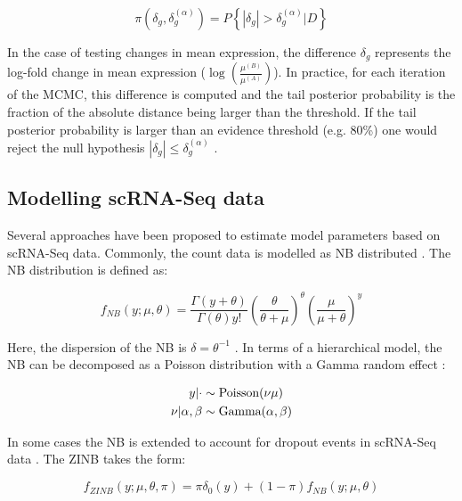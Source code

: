 \begin{equation}
\pi(\delta_g,\delta_g^{(\alpha)})=P\left\lbrace|\delta_g|>\delta_g^{(\alpha)}|D\right\rbrace
\end{equation}

In the case of testing changes in mean expression, the difference $\delta_g$ represents the log-fold change in mean expression ($\log(\frac{\mu^{(B)}}{\mu^{(A)}})$). 
In practice, for each iteration of the MCMC, this difference is computed and the tail posterior probability is the fraction of the absolute distance being larger than the threshold. 
If the tail posterior probability is larger than an evidence threshold (e.g. 80\%) one would reject the null hypothesis $|\delta_g|\leq\delta_g^{(\alpha)}$ \citep{Vallejos2016}. 

\subsection{Modelling scRNA-Seq data}

Several approaches have been proposed to estimate model parameters based on scRNA-Seq data. 
Commonly, the count data is modelled as \gls{NB} distributed \citep{Vallejos2015BASiCS, Risso2018, Lopez2018}. 
The NB distribution is defined as:

\begin{equation}
f_{NB}(y;\mu,\theta)=\frac{\Gamma(y+\theta)}{\Gamma(\theta)y!}\left(\frac{\theta}{\theta + \mu}\right)^\theta\left(\frac{\mu}{\mu + \theta}\right)^y
\end{equation}

Here, the dispersion of the NB is $\delta=\theta^{-1}$ \cite{Risso2018}. 
In terms of a hierarchical model, the NB can be decomposed as a Poisson distribution with a Gamma random effect \cite{Vallejos2015BASiCS}:

\begin{align*}
y|\cdot&\sim{}\textnormal{Poisson}(\nu\mu)\\
\nu|\alpha,\beta&\sim{}\textnormal{Gamma}(\alpha,\beta)
\end{align*}

In some cases \citep{Risso2018, Lopez2018} the NB is extended to account for dropout events in scRNA-Seq data \citep{Kharchenko2015}. 
The \gls{ZINB} takes the form:

\begin{equation}
f_{ZINB}(y;\mu,\theta,\pi)=\pi\delta_0(y) + (1-\pi)f_{NB}(y;\mu,\theta) 
\end{equation}

